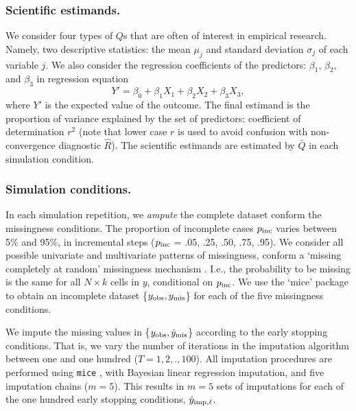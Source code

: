 \documentclass[Royal,times,sageh]{sagej}
\begin{document}
\hypertarget{scientific-estimands.}{%
\subsubsection{Scientific estimands.}\label{scientific-estimands.}}

We consider four types of \(Q\)s that are often of interest in empirical research. Namely, two descriptive statistics: the mean \(\mu_j\) and standard deviation \(\sigma_j\) of each variable \(j\). We also consider the regression coefficients of the predictors: \(\beta_1\), \(\beta_2\), and \(\beta_3\) in regression equation
\[Y' = \beta_0 + \beta_1 X_1 + \beta_2 X_2 + \beta_3 X_3,\]
where \(Y'\) is the expected value of the outcome. The final estimand is the proportion of variance explained by the set of predictors: coefficient of determination \(r^2\) (note that lower case \(r\) is used to avoid confusion with non-convergence diagnostic \(\widehat{R}\)). The scientific estimands are estimated by \(\bar{Q}\) in each simulation condition.

\hypertarget{simulation-conditions.}{%
\subsubsection{Simulation conditions.}\label{simulation-conditions.}}

In each simulation repetition, we \emph{ampute} the complete dataset conform the missingness conditions. The proportion of incomplete cases \(p_{\rm inc}\) varies between 5\% and 95\%, in incremental steps (\(p_{\rm inc}\) = .05, .25, .50, .75, .95). We consider all possible univariate and multivariate patterns of missingness, conform a `missing completely at random' missingness mechanism \citep[MCAR;][]{rubin87}. I.e., the probability to be missing is the same for all \(N \times k\) cells in \(y\), conditional on \(p_{\rm inc}\). We use the `mice' package \citep[function \texttt{mice::ampute()};][]{mice} to obtain an incomplete dataset \{\(y_{\rm obs}, y_{\rm mis}\)\} for each of the five missingness conditions.

We impute the missing values in \{\(y_{\rm obs}, \dot y_{\rm mis}\)\} according to the early stopping conditions. That is, we vary the number of iterations in the imputation algorithm between one and one hundred (\(T = 1,2,.,100\)). All imputation procedures are performed using \texttt{mice} \citep[function \texttt{mice()};][]{mice}, with Bayesian linear regression imputation, and five imputation chains (\(m=5\)). This results in \(m=5\) sets of imputations for each of the one hundred early stopping conditions, \(\dot y_{\rm imp, \ell}\).
\end{document}
